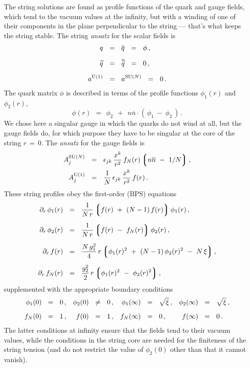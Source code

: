 \documentclass[12pt]{article}
\def\beq{\begin{equation}}
\def\eeq{\end{equation}}
\newcommand{\p}{\partial}
\newcommand{\wt}{\widetilde}
\newcommand{\ov}{\overline}
\newcommand{\lgr}{\left\lgroup}
\newcommand{\rgr}{\right\rgroup}
\newcommand{\aU}{a^{\rm U(1)}}
\newcommand{\aN}{a^\text{SU($N$)}}
\newcommand{\nnbar}{n\ov{n}}
\newcommand{\qt}{\wt{q}}
\newcommand{\bq}{\ov{q}}
\newcommand{\bqt}{\overline{\widetilde{q}}}
\newcommand{\ansatz}{{\it ansatz} }
\begin{document}
	The string solutions are found as profile functions of the quark and gauge fields, which tend
	to the vacuum values at the infinity, but with a winding of one of their components 
	in the plane perpendicular to the string --- that's what   keeps the string stable.
	The string \ansatz for the scalar fields is
\begin{align}
%
\notag
	q    & ~~=~~    \bq    ~~=~~    \phi\,,    \\[2mm]
%
\label{qansatz}
	\qt    & ~~=~~    \bqt    ~~=~~    0\,,    \\[2mm]
%
\notag
	\aU    & ~~=~~    \aN    ~~=~~    0\,.
\end{align}
	The quark matrix $ \phi $ is described in terms of the profile functions $ \phi_1(r) $ and $ \phi_2(r) $,
\beq
	\phi(r)    ~~=~~    \phi_2  ~~+~~  \nnbar \cdot (\, \phi_1 ~-~ \phi_2 \,)\,.
\eeq
	We chose here a singular gauge in which the quarks do not wind at all, but the gauge fields do,
	for which purpose they have to be singular at the core of the string $ r \,=\, 0 $.
	The \ansatz for the gauge fields is
\begin{align}
%
\notag
	A_j^\text{SU($N$)}    & ~~=~~    \epsilon_{jk}\, \frac{x^k}{r^2}\, f_N(r) \lgr \nnbar ~-~ 1/N \rgr ,
	\\
%
\label{Aansatz}
	A_j^\text{U(1)}    & ~~=~~    \frac{1}{N}\, \epsilon_{jk}\, \frac{x^k}{r^2}\, f(r)\,.
\end{align}
	These string profiles obey the first-order (BPS) equations
\begin{align}
%
\notag
	\p_r\, \phi_1(r)    & ~~=~~    \frac{1}{N\,r} \lgr f(r) ~+~ (N - 1)\,f(r) \rgr \phi_1(r)\,,
	\\[2mm]
%
\notag
	\p_r\, \phi_2(r)    & ~~=~~    \frac{1}{N\,r} \lgr f(r) ~-~ f_N(r) \rgr \phi_2(r)\,,
	\\[2mm]
%
\label{BPS}
	\p_r\, f(r)    & ~~=~~    \frac{N\, g_1^2}{4}\, r \lgr \phi_1(r)^2  ~+~ (N-1)\,\phi_2(r)^2  ~-~  N\,\xi \rgr ,
	\\[2mm]
%
\notag
	\p_r\, f_N(r)    & ~~=~~    \frac{g_2^2}{2}\, r \lgr \phi_1(r)^2  ~-~  \phi_2(r)^2 \rgr ,
\end{align}
	supplemented with the appropriate boundary conditions
\begin{align}
%
\notag
	  \phi_1(0)    & ~~=~~    0\,,
	& \phi_2(0)    & ~~\neq~~    0\,,
	& \phi_1(\infty)    & ~~=~~ \sqrt{\xi}\,,
	& \phi_2(\infty)    & ~~=~~ \sqrt{\xi}\,,
	\\[2mm]
%
	f_N(0)    & ~~=~~ 1\,,
	& f(0)    & ~~=~~ 1\,,
	& f_N(\infty)    & ~~=~~ 0\,,
	& f(\infty)    & ~~=~~ 0\,.
\end{align}
	The latter conditions at infinity ensure that the fields tend to their vacuum values, while
	the conditions in the string core are needed for the finiteness of the string tension 
	(and do not restrict the value of $ \phi_2(0) $ other than that it cannot vanish).
\end{document}
